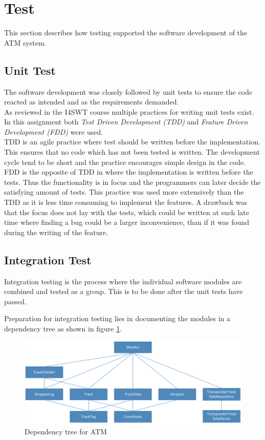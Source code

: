 	\section{Test}
	This section describes how testing supported the software development of the ATM system.
	
	\subsection{Unit Test}
	The software development was closely followed by unit tests to ensure the code reacted as intended and as the requirements demanded.\\
	
	As reviewed in the I4SWT course multiple practices for writing unit tests exist. In this assignment both \emph{Test Driven Development (TDD)} and \emph{Feature Driven Development (FDD)} were used.\\
	TDD is an agile practice where test should be written before the implementation. This ensures that no code which has not been tested is written. The development cycle tend to be short and the practice encourages simple design in the code.\\
	
	FDD is the opposite of TDD in where the implementation is written before the tests. Thus the functionality is in focus and the programmers can later decide the satisfying amount of tests. This practice was used more extensively than the TDD as it is less time consuming to implement the features. A drawback was that the focus does not lay with the tests, which could be written at such late time where finding a bug could be a larger inconvenience, than if it was found during the writing of the feature.
	
	\subsection{Integration Test}
	Integration testing is the process where the individual software modules are combined and tested as a group. This is to be done after the unit tests have passed. 
	
	Preparation for integration testing lies in documenting the modules in a dependency tree as shown in figure \ref{fig:Dependencytree}. 
	
	
	\begin{figure}
		\centering
		\includegraphics[width=1.0\linewidth]{"Images/Dependencytree"}
		\caption{Dependency tree for ATM}
		\label{fig:Dependencytree}
	\end{figure}
	
